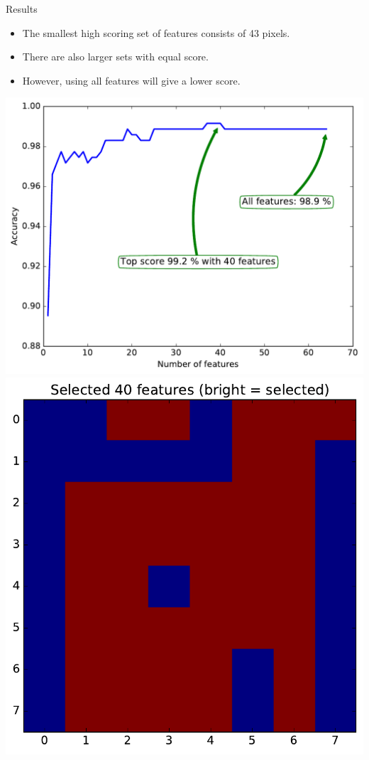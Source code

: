 \documentclass[10pt, aspectratio=169]{beamer} %
\begin{document}
\begin{frame}{Results}
\begin{itemize}
\item The smallest high scoring set of features consists of 43 pixels.
\item There are also larger sets with equal score.
\item However, using all features will give a lower score.
\end{itemize}
\begin{center}
	\includegraphics[height=0.4\textheight]{rfe_accuracy.pdf}
\qquad
\includegraphics[height=0.4\textheight]{rfe_mask.pdf}
\end{center}
\end{frame}
\end{document}
